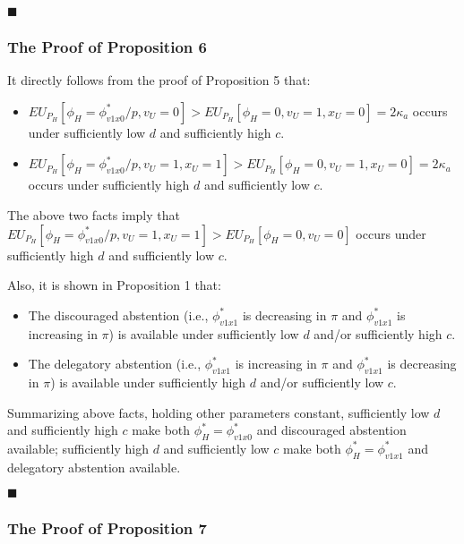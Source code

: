 \hfill $\blacksquare$

\subsubsection{The Proof of Proposition 6}

\par It directly follows from the proof of Proposition 5 that:
\begin{itemize}
	\item $EU_{P_H}[\phi_H = \phi^*_{v1x0}/p, v_U = 0] > EU_{P_H}[\phi_H=0, v_U=1, x_U=0]=2\kappa_a$ occurs under sufficiently low $d$ and sufficiently high $c$. 
	\item $EU_{P_H}[\phi_H = \phi^*_{v1x0}/p, v_U = 1, x_U = 1] > EU_{P_H}[\phi_H=0, v_U=1, x_U=0]=2\kappa_a$ occurs under sufficiently high $d$ and sufficiently low $c$.
\end{itemize}
\noindent The above two facts imply that $EU_{P_H}[\phi_H = \phi^*_{v1x0}/p, v_U = 1, x_U = 1] > EU_{P_H}[\phi_H=0, v_U=0]$ occurs under sufficiently high $d$ and sufficiently low $c$.

\par Also, it is shown in Proposition 1 that:
\begin{itemize}
	\item The discouraged abstention (i.e., $\phi^*_{v1x1}$ is decreasing in $\pi$ and $\phi^*_{v1x1}$ is increasing in $\pi$) is available under sufficiently low $d$ and/or sufficiently high $c$. 
	\item The delegatory abstention (i.e., $\phi^*_{v1x1}$ is increasing in $\pi$ and $\phi^*_{v1x1}$ is decreasing in $\pi$) is available under sufficiently high $d$ and/or sufficiently low $c$.
\end{itemize}

\par Summarizing above facts, holding other parameters constant, sufficiently low $d$ and sufficiently high $c$ make both $\phi^*_H = \phi^*_{v1x0}$ and discouraged abstention available; sufficiently high $d$ and sufficiently low $c$ make both $\phi^*_H = \phi^*_{v1x1}$ and delegatory abstention available. 

\hfill $\blacksquare$

\subsubsection{The Proof of Proposition 7}

